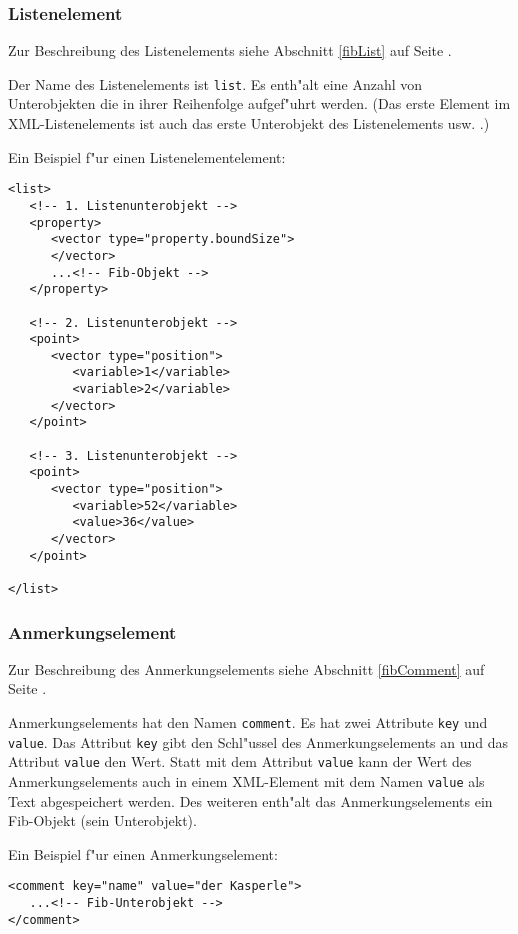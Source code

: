 

\subsubsection{Listenelement}

Zur Beschreibung des Listenelements siehe Abschnitt \ref{fibList} auf Seite \pageref{fibList} .

Der Name des Listenelements ist \verb|list|. Es enth"alt eine Anzahl von Unterobjekten die in ihrer Reihenfolge aufgef"uhrt werden. (Das erste Element im XML-Listenelements ist auch das erste Unterobjekt des Listenelements usw. .)

\bigskip\noindent
Ein Beispiel f"ur einen Listenelementelement:
\begin{verbatim}
<list>
   <!-- 1. Listenunterobjekt -->
   <property>
      <vector type="property.boundSize">
      </vector>
      ...<!-- Fib-Objekt -->
   </property>

   <!-- 2. Listenunterobjekt -->
   <point>
      <vector type="position">
         <variable>1</variable>
         <variable>2</variable>
      </vector>
   </point>

   <!-- 3. Listenunterobjekt -->
   <point>
      <vector type="position">
         <variable>52</variable>
         <value>36</value>
      </vector>
   </point>

</list>
\end{verbatim}



\subsubsection{Anmerkungselement}

Zur Beschreibung des Anmerkungselements siehe Abschnitt \ref{fibComment} auf Seite \pageref{fibComment} .

Anmerkungselements hat den Namen \verb|comment|. Es hat zwei Attribute \verb|key| und \verb|value|. Das Attribut \verb|key| gibt den Schl"ussel des Anmerkungselements an und das Attribut \verb|value| den Wert. Statt mit dem Attribut \verb|value| kann der Wert des Anmerkungselements auch in einem XML-Element mit dem Namen \verb|value| als Text abgespeichert werden.
Des weiteren enth"alt das Anmerkungselements ein Fib-Objekt (sein Unterobjekt).

\bigskip\noindent
Ein Beispiel f"ur einen Anmerkungselement:
\begin{verbatim}
<comment key="name" value="der Kasperle">
   ...<!-- Fib-Unterobjekt -->
</comment>
\end{verbatim}

